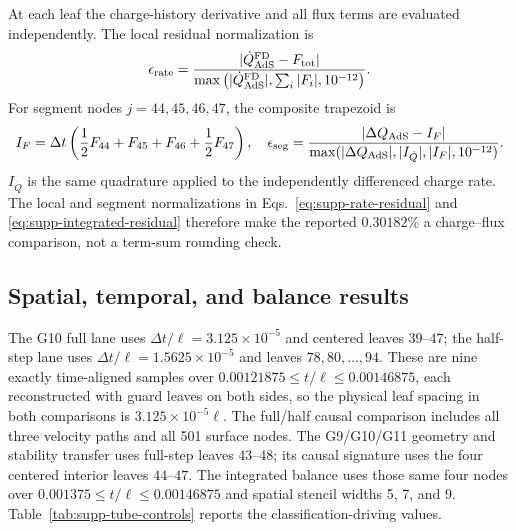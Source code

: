 \documentclass[11pt]{article}
\begin{document}
At each leaf the charge-history derivative and all flux terms are evaluated
independently.  The local residual normalization is
\begin{equation}
\epsilon_{\rm rate}=
\frac{|\dot Q_{\rm AdS}^{\rm FD}-F_{\rm tot}|}
{\max\left(|\dot Q_{\rm AdS}^{\rm FD}|,
\sum_i|F_i|,10^{-12}\right)}.
\label{eq:supp-rate-residual}
\end{equation}
For segment nodes $j=44,45,46,47$, the composite trapezoid is
\begin{equation}
I_F=\Delta t\left(\frac12F_{44}+F_{45}+F_{46}+\frac12F_{47}\right),
\quad
\epsilon_{\rm seg}=
\frac{|\Delta Q_{\rm AdS}-I_F|}
{\max(|\Delta Q_{\rm AdS}|,|I_{\dot Q}|,|I_F|,10^{-12})}.
\label{eq:supp-integrated-residual}
\end{equation}
$I_{\dot Q}$ is the same quadrature applied to the independently differenced
charge rate.  The local and segment normalizations in
Eqs.~\eqref{eq:supp-rate-residual} and
\eqref{eq:supp-integrated-residual} therefore make the reported $0.30182\%$
a charge--flux comparison, not a term-sum rounding check.

\subsection{Spatial, temporal, and balance results}

The G10 full lane uses $\Delta t/\ell=3.125\times10^{-5}$ and centered leaves
$39$--$47$; the half-step lane uses $\Delta t/\ell=1.5625\times10^{-5}$ and
leaves $78,80,\ldots,94$.  These are nine exactly time-aligned samples over
$0.00121875\leq t/\ell\leq0.00146875$, each reconstructed with guard leaves on
both sides, so the physical leaf spacing in both comparisons is
$3.125\times10^{-5}\ell$.  The full/half causal comparison includes all three
velocity paths and all 501 surface nodes.  The G9/G10/G11 geometry and
stability transfer uses full-step leaves $43$--$48$; its causal signature uses
the four centered interior leaves $44$--$47$.  The integrated balance uses
those same four nodes over
$0.001375\leq t/\ell\leq0.00146875$ and spatial stencil widths 5, 7, and 9.
Table~\ref{tab:supp-tube-controls} reports the classification-driving values.
\end{document}
